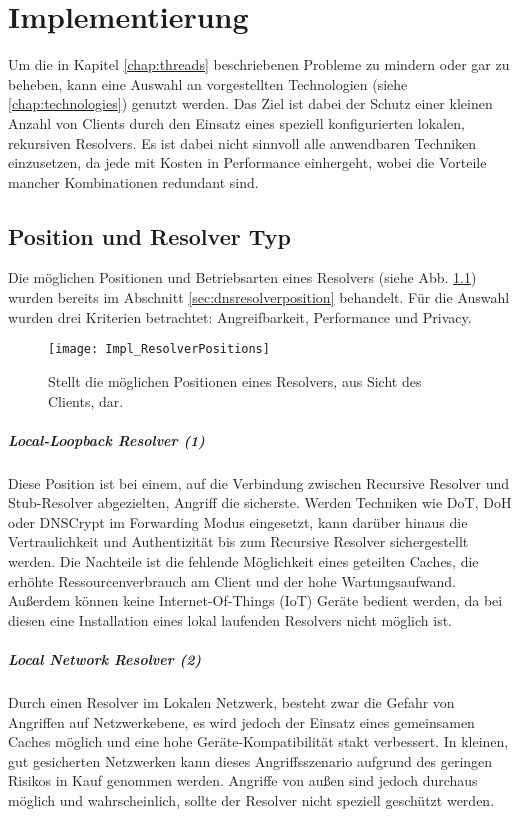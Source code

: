\chapter{Implementierung}
\label{chap:implementation}

Um die in Kapitel \ref{chap:threads} beschriebenen Probleme zu mindern oder gar zu beheben, kann eine Auswahl an vorgestellten Technologien (siehe \ref{chap:technologies}) genutzt werden. Das Ziel ist dabei der Schutz einer kleinen Anzahl von Clients durch den Einsatz eines speziell konfigurierten lokalen, rekursiven Resolvers. Es ist dabei nicht sinnvoll alle anwendbaren Techniken einzusetzen, da jede mit Kosten in Performance einhergeht, wobei die Vorteile mancher Kombinationen redundant sind.

\section{Position und Resolver Typ}
Die möglichen Positionen und Betriebsarten eines Resolvers (siehe Abb. \ref{img:impl-resolverpositions}) wurden bereits im Abschnitt \ref{sec:dnsresolverposition} behandelt. Für die Auswahl wurden drei Kriterien betrachtet: Angreifbarkeit, Performance und Privacy.
\begin{figure}[hb]
    \centering
    \texttt{[image: Impl\_ResolverPositions]}
    \caption{Stellt die möglichen Positionen eines Resolvers, aus Sicht des Clients, dar.}
    \label{img:impl-resolverpositions}
\end{figure}

\paragraph{Local-Loopback Resolver (1)}
Diese Position ist bei einem, auf die Verbindung zwischen Recursive Resolver und Stub-Resolver abgezielten, Angriff die sicherste. Werden Techniken wie DoT, DoH oder DNSCrypt im Forwarding Modus eingesetzt, kann darüber hinaus die Vertraulichkeit und Authentizität bis zum Recursive Resolver sichergestellt werden. Die Nachteile ist die fehlende Möglichkeit eines geteilten Caches, die erhöhte Ressourcenverbrauch am Client und der hohe Wartungsaufwand. Außerdem können keine Internet-Of-Things (IoT) Geräte bedient werden, da bei diesen eine Installation eines lokal laufenden Resolvers nicht möglich ist.

\paragraph{Local Network Resolver (2)}
Durch einen Resolver im Lokalen Netzwerk, besteht zwar die Gefahr von Angriffen auf Netzwerkebene, es wird jedoch der Einsatz eines gemeinsamen Caches möglich und eine hohe Geräte-Kompatibilität stakt verbessert. In kleinen, gut gesicherten Netzwerken kann dieses Angriffsszenario aufgrund des geringen Risikos in Kauf genommen werden. Angriffe von außen sind jedoch durchaus möglich und wahrscheinlich, sollte der Resolver nicht speziell geschützt werden.

